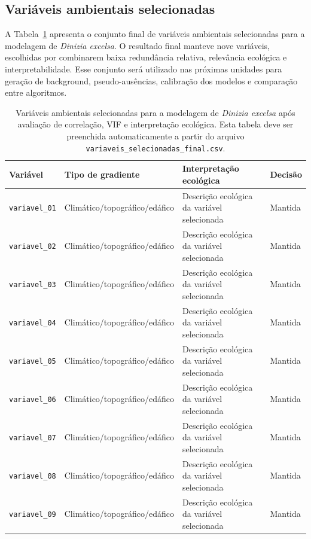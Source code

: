 \subsection{Variáveis ambientais selecionadas}

A Tabela~\ref{tab:variaveis_selecionadas_final} apresenta o conjunto final de variáveis ambientais selecionadas para a modelagem de \textit{Dinizia excelsa}. O resultado final manteve nove variáveis, escolhidas por combinarem baixa redundância relativa, relevância ecológica e interpretabilidade. Esse conjunto será utilizado nas próximas unidades para geração de background, pseudo-ausências, calibração dos modelos e comparação entre algoritmos.

\begin{table}[H]
	\centering
	\caption{Variáveis ambientais selecionadas para a modelagem de \textit{Dinizia excelsa} após avaliação de correlação, VIF e interpretação ecológica. Esta tabela deve ser preenchida automaticamente a partir do arquivo \texttt{variaveis\_selecionadas\_final.csv}.}
	\label{tab:variaveis_selecionadas_final}
	\small
	\begin{tabular}{p{3.2cm}p{4.2cm}p{5.8cm}p{3.0cm}}
		\toprule
		\textbf{Variável} & \textbf{Tipo de gradiente} & \textbf{Interpretação ecológica} & \textbf{Decisão} \\
		\midrule
		\texttt{variavel\_01} & Climático/topográfico/edáfico & Descrição ecológica da variável selecionada & Mantida \\
		\texttt{variavel\_02} & Climático/topográfico/edáfico & Descrição ecológica da variável selecionada & Mantida \\
		\texttt{variavel\_03} & Climático/topográfico/edáfico & Descrição ecológica da variável selecionada & Mantida \\
		\texttt{variavel\_04} & Climático/topográfico/edáfico & Descrição ecológica da variável selecionada & Mantida \\
		\texttt{variavel\_05} & Climático/topográfico/edáfico & Descrição ecológica da variável selecionada & Mantida \\
		\texttt{variavel\_06} & Climático/topográfico/edáfico & Descrição ecológica da variável selecionada & Mantida \\
		\texttt{variavel\_07} & Climático/topográfico/edáfico & Descrição ecológica da variável selecionada & Mantida \\
		\texttt{variavel\_08} & Climático/topográfico/edáfico & Descrição ecológica da variável selecionada & Mantida \\
		\texttt{variavel\_09} & Climático/topográfico/edáfico & Descrição ecológica da variável selecionada & Mantida \\
		\bottomrule
	\end{tabular}
\end{table}

